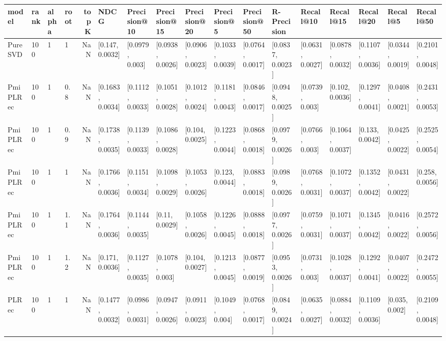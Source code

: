 \begin{tabular}{llllrllllllllllll}
\toprule
    model & rank & alpha & root &  topK &              NDCG &      Precision@10 &      Precision@15 &      Precision@20 &       Precision@5 &      Precision@50 &       R-Precision &         Recall@10 &         Recall@15 &         Recall@20 &          Recall@5 &         Recall@50 \\
\midrule
  PureSVD &  100 &     1 &    1 &   NaN &   [0.147, 0.0032] &   [0.0979, 0.003] &  [0.0938, 0.0026] &  [0.0906, 0.0023] &  [0.1033, 0.0039] &  [0.0764, 0.0017] &  [0.0837, 0.0023] &  [0.0631, 0.0027] &  [0.0878, 0.0032] &  [0.1107, 0.0036] &  [0.0344, 0.0019] &  [0.2101, 0.0048] \\
 PmiPLRec &  100 &     1 &  0.8 &   NaN &  [0.1683, 0.0034] &  [0.1112, 0.0033] &  [0.1051, 0.0028] &  [0.1012, 0.0024] &  [0.1181, 0.0043] &  [0.0846, 0.0017] &  [0.0948, 0.0025] &   [0.0739, 0.003] &   [0.102, 0.0036] &  [0.1297, 0.0041] &  [0.0408, 0.0021] &  [0.2431, 0.0053] \\
 PmiPLRec &  100 &     1 &  0.9 &   NaN &  [0.1738, 0.0035] &  [0.1139, 0.0033] &  [0.1086, 0.0028] &   [0.104, 0.0025] &  [0.1223, 0.0044] &  [0.0868, 0.0018] &  [0.0979, 0.0026] &   [0.0766, 0.003] &  [0.1064, 0.0037] &   [0.133, 0.0042] &  [0.0425, 0.0022] &  [0.2525, 0.0054] \\
 PmiPLRec &  100 &     1 &    1 &   NaN &  [0.1766, 0.0036] &  [0.1151, 0.0034] &  [0.1098, 0.0029] &  [0.1053, 0.0026] &   [0.123, 0.0044] &  [0.0883, 0.0018] &  [0.0989, 0.0026] &  [0.0768, 0.0031] &  [0.1072, 0.0037] &  [0.1352, 0.0042] &  [0.0431, 0.0022] &   [0.258, 0.0056] \\
 PmiPLRec &  100 &     1 &  1.1 &   NaN &  [0.1764, 0.0036] &  [0.1144, 0.0035] &    [0.11, 0.0029] &  [0.1058, 0.0026] &  [0.1226, 0.0045] &  [0.0888, 0.0018] &  [0.0977, 0.0026] &  [0.0759, 0.0031] &  [0.1071, 0.0037] &  [0.1345, 0.0042] &  [0.0416, 0.0022] &  [0.2572, 0.0056] \\
 PmiPLRec &  100 &     1 &  1.2 &   NaN &   [0.171, 0.0036] &  [0.1127, 0.0035] &   [0.1078, 0.003] &   [0.104, 0.0027] &  [0.1213, 0.0045] &  [0.0877, 0.0019] &  [0.0953, 0.0026] &   [0.0731, 0.003] &  [0.1028, 0.0037] &  [0.1292, 0.0041] &  [0.0407, 0.0022] &  [0.2472, 0.0055] \\
    PLRec &  100 &     1 &    1 &   NaN &  [0.1477, 0.0032] &  [0.0986, 0.0031] &  [0.0947, 0.0026] &  [0.0911, 0.0023] &   [0.1049, 0.004] &  [0.0768, 0.0017] &  [0.0849, 0.0024] &  [0.0635, 0.0027] &  [0.0884, 0.0032] &  [0.1109, 0.0036] &    [0.035, 0.002] &  [0.2109, 0.0048] \\

\end{tabular}
